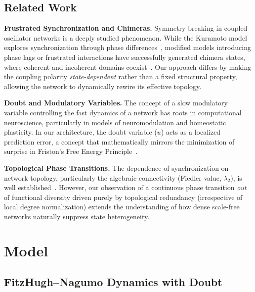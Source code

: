 \documentclass[11pt]{article}
\begin{document}
\subsection{Related Work}
\label{sec:related}
\textbf{Frustrated Synchronization and Chimeras.} Symmetry breaking in coupled oscillator networks is a deeply studied phenomenon. While the Kuramoto model explores synchronization through phase differences~\cite{acebrn2005}, modified models introducing phase lags or frustrated interactions have successfully generated chimera states, where coherent and incoherent domains coexist~\cite{abrams2004}. Our approach differs by making the coupling polarity \emph{state-dependent} rather than a fixed structural property, allowing the network to dynamically rewire its effective topology.

\textbf{Doubt and Modulatory Variables.} The concept of a slow modulatory variable controlling the fast dynamics of a network has roots in computational neuroscience, particularly in models of neuromodulation and homeostatic plasticity. In our architecture, the doubt variable ($u$) acts as a localized prediction error, a concept that mathematically mirrors the minimization of surprise in Friston's Free Energy Principle~\cite{friston2010}.

\textbf{Topological Phase Transitions.} The dependence of synchronization on network topology, particularly the algebraic connectivity (Fiedler value, $\lambda_2$), is well established~\cite{pikovsky2001}. However, our observation of a continuous phase transition \emph{out} of functional diversity driven purely by topological redundancy (irrespective of local degree normalization) extends the understanding of how dense scale-free networks naturally suppress state heterogeneity.
\section{Model}
\label{sec:model}

\subsection{FitzHugh--Nagumo Dynamics with Doubt}
\end{document}
